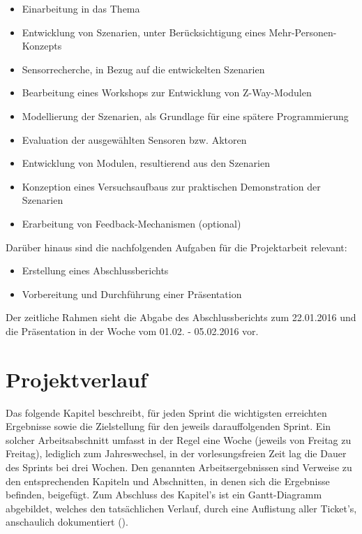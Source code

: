 \documentclass[12pt, oneside, smallheadings]{scrbook}
\begin{document}
\begin{itemize}
\item Einarbeitung in das Thema
\item Entwicklung von Szenarien, unter Berücksichtigung eines Mehr-Personen-Konzepts
\item Sensorrecherche, in Bezug auf die entwickelten Szenarien
\item Bearbeitung eines Workshops zur Entwicklung von Z-Way-Modulen
\item Modellierung der Szenarien, als Grundlage für eine spätere Programmierung
\item Evaluation der ausgewählten Sensoren bzw. Aktoren
\item Entwicklung von Modulen, resultierend aus den Szenarien
\item Konzeption eines Versuchsaufbaus zur praktischen Demonstration der Szenarien
\item Erarbeitung von Feedback-Mechanismen (optional)\\
\end{itemize}
\noindent
Darüber hinaus sind die nachfolgenden Aufgaben für die Projektarbeit relevant:\\

\begin{itemize}
\item Erstellung eines Abschlussberichts
\item Vorbereitung und Durchführung einer Präsentation\\
\end{itemize}
\noindent
Der zeitliche Rahmen sieht die Abgabe des Abschlussberichts zum 22.01.2016 und die Präsentation in der Woche vom 01.02. - 05.02.2016 vor.

\chapter{Projektverlauf}

Das folgende Kapitel beschreibt, für jeden Sprint die wichtigsten erreichten Ergebnisse sowie die Zielstellung für den jeweils darauffolgenden Sprint. Ein solcher Arbeitsabschnitt umfasst in der Regel eine Woche (jeweils von Freitag zu Freitag), lediglich zum Jahreswechsel, in der vorlesungsfreien Zeit lag die Dauer des Sprints bei drei Wochen. Den genannten Arbeitsergebnissen sind Verweise zu den entsprechenden Kapiteln und Abschnitten, in denen sich die Ergebnisse befinden, beigefügt. Zum Abschluss des Kapitel's ist ein Gantt-Diagramm abgebildet, welches den tatsächlichen Verlauf, durch eine Auflistung aller Ticket's, anschaulich dokumentiert ().
\end{document}
